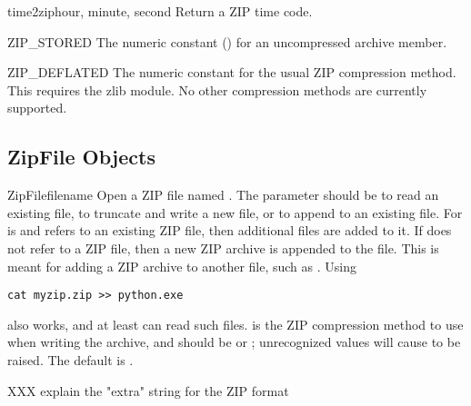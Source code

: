 \begin{funcdesc}{time2zip}{hour, minute, second}
  Return a ZIP time code.
\end{funcdesc}

\begin{datadesc}{ZIP_STORED}
  The numeric constant () for an uncompressed archive member.
\end{datadesc}

\begin{datadesc}{ZIP_DEFLATED}
  The numeric constant for the usual ZIP compression method.  This
  requires the zlib module.  No other compression methods are
  currently supported.
\end{datadesc}


\begin{seealso}
\end{seealso}


\subsection{ZipFile Objects \label{zipfile-objects}}

\begin{classdesc}{ZipFile}{filename} 
  Open a ZIP file named .  The  parameter
  should be  to read an existing file,  to
  truncate and write a new file, or  to append to an
  existing file.  For  is  and 
  refers to an existing ZIP file, then additional files are added to
  it.  If  does not refer to a ZIP file, then a new ZIP
  archive is appended to the file.  This is meant for adding a ZIP
  archive to another file, such as .  Using
\begin{verbatim}
cat myzip.zip >> python.exe
\end{verbatim}
  also works, and at least  can read such files.
   is the ZIP compression method to use when writing
  the archive, and should be  or
  ; unrecognized values will cause
   to be raised.  The default is
  . 
\end{classdesc}

XXX explain the "extra" string for the ZIP format

